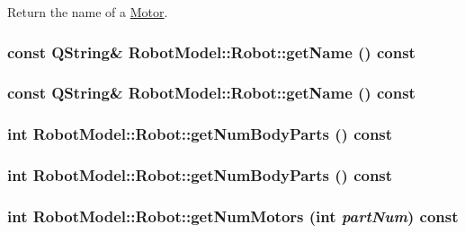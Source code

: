 Return the name of a \hyperlink{class_robot_model_1_1_motor}{Motor}. \hypertarget{class_robot_model_1_1_robot_a07a4dcd2c34da89415576c53b42d9406}{
\subsubsection[{getName}]{\setlength{\rightskip}{0pt plus 5cm}const QString\& RobotModel::Robot::getName () const}}
\label{class_robot_model_1_1_robot_a07a4dcd2c34da89415576c53b42d9406}
\hypertarget{class_robot_model_1_1_robot_a07a4dcd2c34da89415576c53b42d9406}{
\subsubsection[{getName}]{\setlength{\rightskip}{0pt plus 5cm}const QString\& RobotModel::Robot::getName () const}}
\label{class_robot_model_1_1_robot_a07a4dcd2c34da89415576c53b42d9406}
\hypertarget{class_robot_model_1_1_robot_a16f942cf3364608585f5a352be0dc286}{
\subsubsection[{getNumBodyParts}]{\setlength{\rightskip}{0pt plus 5cm}int RobotModel::Robot::getNumBodyParts () const}}
\label{class_robot_model_1_1_robot_a16f942cf3364608585f5a352be0dc286}
\hypertarget{class_robot_model_1_1_robot_a16f942cf3364608585f5a352be0dc286}{
\subsubsection[{getNumBodyParts}]{\setlength{\rightskip}{0pt plus 5cm}int RobotModel::Robot::getNumBodyParts () const}}
\label{class_robot_model_1_1_robot_a16f942cf3364608585f5a352be0dc286}
\hypertarget{class_robot_model_1_1_robot_aae3de10ec98969b5def3adc436483362}{
\subsubsection[{getNumMotors}]{\setlength{\rightskip}{0pt plus 5cm}int RobotModel::Robot::getNumMotors (int {\em partNum}) const}}
\label{class_robot_model_1_1_robot_aae3de10ec98969b5def3adc436483362}



